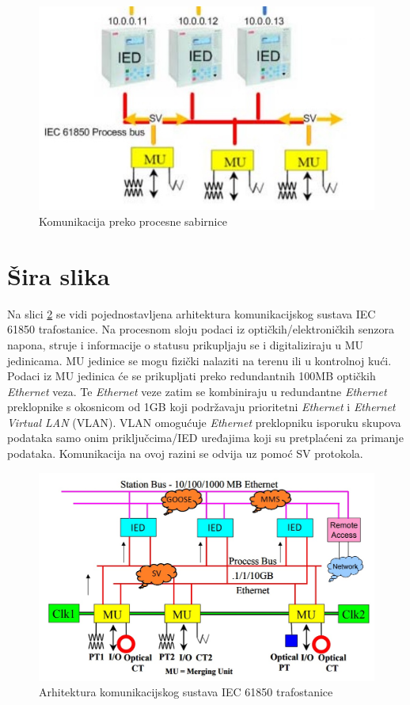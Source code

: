 \documentclass[times, utf8, zavrsni]{fer}
\begin{document}
\begin{figure}[tph]
    \centering
    \includegraphics[scale=0.6]{img/IEC61850-process-bus-sv.jpg}
    \caption{Komunikacija preko procesne sabirnice\footnotemark}
    \label{fig:iec-process-bus-sv}
\end{figure}

\section{Šira slika}
Na slici \ref{fig:iec-architecture} se vidi pojednostavljena arhitektura komunikacijskog sustava IEC 61850 trafostanice. Na procesnom sloju podaci iz optičkih/elektroničkih senzora napona, struje i informacije o statusu  prikupljaju se i digitaliziraju u MU jedinicama. MU jedinice se mogu fizički nalaziti na terenu ili u kontrolnoj kući. Podaci iz MU jedinica će se prikupljati preko redundantnih 100MB optičkih \textit{Ethernet} veza. Te \textit{Ethernet} veze zatim se kombiniraju u redundantne  \textit{Ethernet} preklopnike s  okosnicom od 1GB koji podržavaju prioritetni \textit{Ethernet} i \textit{Ethernet Virtual LAN} (VLAN). VLAN omogućuje \textit{Ethernet} preklopniku isporuku skupova podataka samo onim priključcima/IED uređajima koji su pretplaćeni za primanje podataka. Komunikacija na ovoj razini se odvija uz pomoć SV protokola.

\begin{figure}[tph]
    \centering
    \includegraphics[scale=0.4]{img/IEC61850-architecture.jpg}
    \caption{Arhitektura komunikacijskog sustava IEC 61850 trafostanice\footnotemark}
    \label{fig:iec-architecture}
\end{figure}
\end{document}
